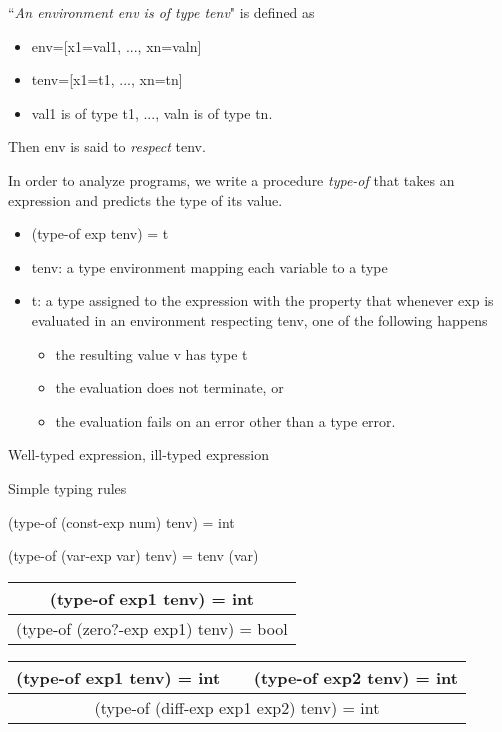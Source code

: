 \documentclass{article}
\begin{document}
\begin{huge}
``{\it An environment env is of type tenv}" is defined as
\begin{itemize}
\item env=[x1=val1, ..., xn=valn]
\item tenv=[x1=t1, ..., xn=tn]
\item val1 is of type t1, ..., valn is of type tn.
\end{itemize}

Then env is said to {\it respect} tenv. 


In order to analyze programs, we write a procedure {\it type-of} that takes an expression and predicts the type of its value.
\begin{itemize}
\item (type-of exp tenv) = t
\item tenv: a type environment mapping each variable to a type
\item t: a type assigned to the expression with the property that 
whenever exp is evaluated in an environment respecting tenv, one of the following happens
\begin{itemize}
\item the resulting value v has type t
\item the evaluation does not terminate, or 
\item the evaluation fails on an error other than a type error.
\end{itemize}
\end{itemize}

Well-typed expression, ill-typed expression


Simple typing rules

(type-of (const-exp num) tenv) = int

(type-of (var-exp var) tenv) = tenv (var)

\begin{tabular}{c}
(type-of exp1 tenv) = int \\ \hline
(type-of (zero?-exp exp1) tenv) = bool
\end{tabular}

\begin{tabular}{c}
(type-of exp1 tenv) = int \ \ \ (type-of exp2 tenv) = int  \\ \hline
(type-of (diff-exp exp1 exp2) tenv) = int
\end{tabular}


\end{huge}
\end{document}
